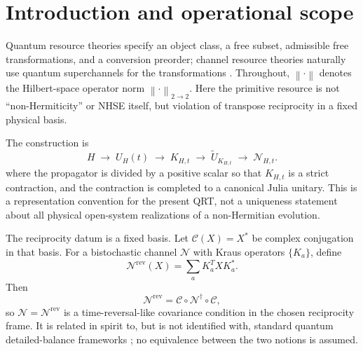 \documentclass[reprint,amsmath,amssymb,aps,nofootinbib]{revtex4-2}
\newcommand{\rev}{\mathrm{rev}}
\newcommand{\norm}[1]{\left\lVert #1\right\rVert}
\begin{document}
\maketitle
\section{Introduction and operational scope}
\label{sec:intro}

Quantum resource theories specify an object class, a free subset, admissible free transformations,
and a conversion preorder; channel resource theories naturally use quantum superchannels for the
transformations \cite{ChitambarGour,LiuYuan,ChiribellaSupermap}. Throughout, $\norm{\cdot}$ denotes
the Hilbert-space operator norm $\norm{\cdot}_{2\to2}$. Here the primitive resource is
not ``non-Hermiticity'' or NHSE itself, but violation of transpose reciprocity in a fixed physical
basis.

The construction is
\begin{equation}
H\;\longrightarrow\;U_H(t)\;\longrightarrow\;K_{H,t}
\;\longrightarrow\;\widetilde U_{K_{H,t}}\;\longrightarrow\;\mathcal N_{H,t}.
\label{eq:architecture}
\end{equation}
where the propagator is divided by a positive scalar so that $K_{H,t}$ is a strict contraction,
and the contraction is completed to a canonical Julia unitary. This is a representation convention
for the present QRT, not a uniqueness statement about all physical open-system realizations of a
non-Hermitian evolution.

The reciprocity datum is a fixed basis. Let $\mathcal C(X)=X^*$ be complex conjugation in that
basis. For a bistochastic channel $\mathcal N$ with Kraus operators $\{K_a\}$, define
\begin{equation}
\mathcal N^{\rev}(X)=\sum_a K_a^T X K_a^*.
\label{eq:channel-transpose}
\end{equation}
Then
\begin{equation}
\mathcal N^{\rev}=\mathcal C\circ\mathcal N^\dagger\circ\mathcal C,
\label{eq:time-reversal}
\end{equation}
so $\mathcal N=\mathcal N^{\rev}$ is a time-reversal-like covariance condition in the chosen
reciprocity frame. It is related in spirit to, but is not identified with, standard quantum detailed-balance frameworks \cite{Agarwal1973,Alicki1976,Kossakowski1977};
no equivalence between the two notions is assumed.
\end{document}
